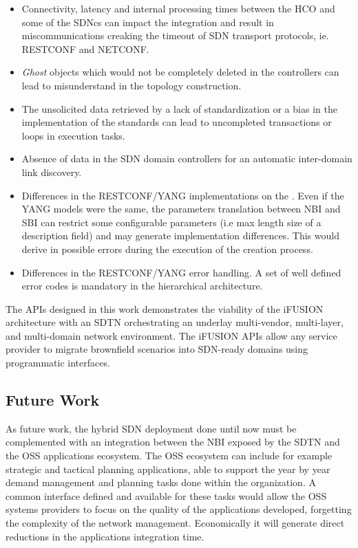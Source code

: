 \documentclass[10pt, conference]{IEEEtran}
\begin{document}
\begin{itemize}
    \item Connectivity, latency and internal processing times between the HCO and some of the SDNcs can impact the integration and result in miscommunications creaking the timeout of SDN transport protocols, ie. RESTCONF and NETCONF.   
    \item \textit{Ghost} objects which would not be completely deleted in the controllers can lead to misunderstand in the topology construction.
    \item The unsolicited data retrieved by a lack of standardization or a bias in the implementation of the standards can lead to uncompleted transactions or loops in execution tasks.
    \item Absence of data in the SDN domain controllers for an automatic inter-domain link discovery.
    \item Differences in the RESTCONF/YANG implementations on the . Even if the YANG models were the same, the parameters translation between NBI and SBI can restrict some configurable parameters (i.e max length size of a description field) and may generate implementation differences. This would derive in possible errors during the execution of the creation process.
    \item Differences in the RESTCONF/YANG error handling. A set of well defined error codes is mandatory in the hierarchical architecture.
\end{itemize}


The APIs designed in this work demonstrates the viability of the i\uppercase{FUSION} architecture with an SDTN  orchestrating an underlay multi-vendor, multi-layer, and multi-domain network environment. The i\uppercase{FUSION} APIs allow any service provider to migrate brownfield scenarios into SDN-ready domains using programmatic interfaces.

\subsection{Future Work}
As future work, the hybrid SDN deployment done until now must be complemented with an integration between the NBI exposed by the SDTN  and the OSS applications ecosystem. The OSS ecosystem can include for example strategic and tactical planning applications, able to support the year by year demand management and planning tasks done within the organization. A common interface defined and available for these tasks would allow the OSS systems providers to focus on the quality of the applications developed, forgetting the complexity of the network management. Economically it will generate direct reductions in the applications integration time.
\end{document}

